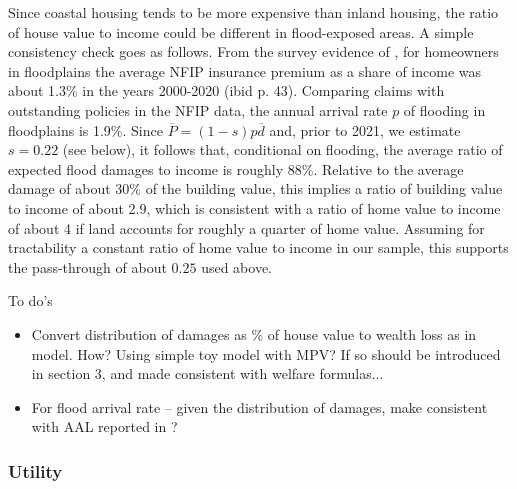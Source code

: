 \documentclass[12pt]{article}
\begin{document}
Since coastal housing tends to be more expensive than inland housing, the ratio of house value to income could be different in flood-exposed areas. A simple consistency check goes as follows. From the survey evidence of \cite{qin2026flood}, for homeowners in floodplains the average NFIP insurance premium as a share of income was about 1.3$\%$ in the years 2000-2020 (ibid p. 43). Comparing claims with outstanding policies in the NFIP data, the annual arrival rate $p$ of flooding in floodplains is 1.9$\%$. Since $\overline{P}=(1-s)p\overline{d}$ and, prior to 2021, we estimate $s=0.22$ (see below), it follows that, conditional on flooding, the average ratio of expected flood damages to income is roughly 88$\%$. Relative to the average damage of about 30$\%$ of the building value, this implies a ratio of building value to income of about 2.9, which is consistent with a ratio of home value to income of about 4 if land accounts for roughly a quarter of home value. Assuming for tractability a constant ratio of home value to income in our sample, this supports the pass-through of about $0.25$ used above.
 
To do's
\begin{itemize}
\item Convert distribution of damages as \% of house value to wealth loss as in model. How? Using simple toy model with MPV? If so should be introduced in section 3, and made consistent with welfare formulas...
\item For flood arrival rate -- given the distribution of damages, make consistent with AAL reported in \cite{amornsiripanitch2025measuring}?
\end{itemize}

\subsubsection{Utility}
\end{document}
